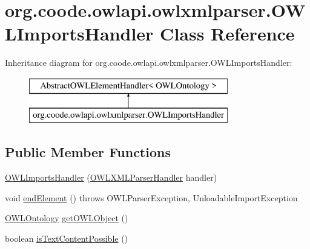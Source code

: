 \hypertarget{classorg_1_1coode_1_1owlapi_1_1owlxmlparser_1_1_o_w_l_imports_handler}{\section{org.\-coode.\-owlapi.\-owlxmlparser.\-O\-W\-L\-Imports\-Handler Class Reference}
\label{classorg_1_1coode_1_1owlapi_1_1owlxmlparser_1_1_o_w_l_imports_handler}
}
Inheritance diagram for org.\-coode.\-owlapi.\-owlxmlparser.\-O\-W\-L\-Imports\-Handler\-:\begin{figure}[H]
\begin{center}
\leavevmode
\includegraphics[height=2.000000cm]{classorg_1_1coode_1_1owlapi_1_1owlxmlparser_1_1_o_w_l_imports_handler}
\end{center}
\end{figure}
\subsection*{Public Member Functions}
\begin{DoxyCompactItemize}
\item 
\hyperlink{classorg_1_1coode_1_1owlapi_1_1owlxmlparser_1_1_o_w_l_imports_handler_ae25665c6d68049b70ff7c526dd24c8d0}{O\-W\-L\-Imports\-Handler} (\hyperlink{classorg_1_1coode_1_1owlapi_1_1owlxmlparser_1_1_o_w_l_x_m_l_parser_handler}{O\-W\-L\-X\-M\-L\-Parser\-Handler} handler)
\item 
void \hyperlink{classorg_1_1coode_1_1owlapi_1_1owlxmlparser_1_1_o_w_l_imports_handler_ae3261b82833066d22a54c7dc9b313e52}{end\-Element} ()  throws O\-W\-L\-Parser\-Exception, Unloadable\-Import\-Exception 
\item 
\hyperlink{interfaceorg_1_1semanticweb_1_1owlapi_1_1model_1_1_o_w_l_ontology}{O\-W\-L\-Ontology} \hyperlink{classorg_1_1coode_1_1owlapi_1_1owlxmlparser_1_1_o_w_l_imports_handler_a9dc4a337cb255b681b8da853ebc3759a}{get\-O\-W\-L\-Object} ()
\item 
boolean \hyperlink{classorg_1_1coode_1_1owlapi_1_1owlxmlparser_1_1_o_w_l_imports_handler_a3f7efc8c4082c6c39f63a95c35e78e09}{is\-Text\-Content\-Possible} ()
\end{DoxyCompactItemize}


